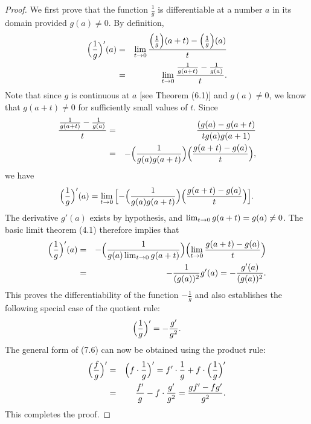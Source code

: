 \begin{proof}
We first prove that the function $\frac{1}{g}$ is differentiable at a number $a$ in its domain provided $g(a) \neq 0$. By definition,
\begin{eqnarray*}
   \Bigl( \frac{1}{g} \Bigr)'(a) 
&=& \lim_{t \rightarrow 0} {\frac{\Bigl( \frac{1}{g} \Bigr) (a + t) - \Bigl( \frac{1}{g} \Bigr)(a)}{t} }  \\
&=& \lim_{t \rightarrow 0} {\frac{\frac{1}{g(a + t)} - \frac{1}{g(a)} }{t} }.
\end{eqnarray*} 
Note that since $g$ is continuous at $a$ [see Theorem (6.1)] and $g(a) \neq 0$, we know that $g(a + t) \neq 0$ for sufficiently small values of $t$. Since
\begin{eqnarray*}
\frac{\frac{1}{g(a + t)} - \frac{1}{g(a)} }{t} 
&=& \frac{(g(a) - g(a + t)}{t g(a) g(a+1) }\\
&=& -\Bigl( \frac{1}{g(a)g(a+t)} \Bigr) \Bigl(\frac{g(a + t) - g(a)}{t} \Bigr),
\end{eqnarray*}
we have
\[
\Bigl(\frac{1}{g} \Bigr)'(a) = \lim_{t \rightarrow 0} {\Bigl[ - \Bigl(\frac{1}{g(a)g(a + t)} \Bigr) \Bigl(\frac{g(a + t) - g(a)}{t} \Bigr) \Bigr]}.
\]
The derivative $g'(a)$ exists by hypothesis, and $\lim_{t \rightarrow 0} g(a + t) = g(a) \neq 0$. The basic limit theorem (4.1) therefore
implies that
\begin{eqnarray*}
\Bigl(\frac{1}{g} \Bigr)'(a) 
&=& - \Bigl( \frac{1}{g(a) \lim_{t \rightarrow 0} g(a + t)} \Bigr) \Bigl(\lim_{t \rightarrow 0} {\frac{g(a + t) - g(a)}{t} \Bigr) }   \\
&=& -\frac{1}{(g(a))^2} g'(a) = -\frac{g'(a)}{(g(a))^2}.
\end{eqnarray*}
This proves the differentiability of the function $-\frac{1}{g}$ and also establishes the following special case of the quotient rule:  
\begin{equation}
\Bigl( \frac{1}{g} \Bigr)' = -\frac{g'}{g^2}.
\label{eq1.7.2}
\end{equation}
The general form of (7.6) can now be obtained using the product rule: 
\begin{eqnarray*}
\Bigl( \frac{f}{g} \Bigr)' 
&=& \Bigl(f \cdot \frac{1}{g} \Bigr)' = f' \cdot {\frac{1}{g}} + f \cdot
\Bigl( \frac{1}{g} \Bigr)' \\
&=&  \frac{f'}{g} - f \cdot \frac{g'}{g^2} = \frac{gf' - fg'}{g^2}.
\end{eqnarray*}
This completes the proof.
\end{proof}

